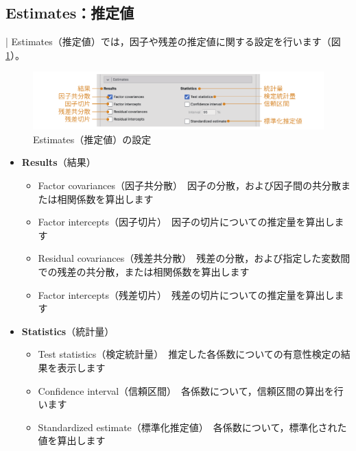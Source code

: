 \documentclass[
  12pt,
  a5jpaper,
  lualatex, ja=standard]{bxjsbook}
\providecommand{\tightlist}{%
  \setlength{\itemsep}{0pt}\setlength{\parskip}{0pt}}
\newenvironment{jmvsettings}{%
	\begin{center}%
	\begin{tcolorbox}[%
		title=設定項目,
		colframe=gmoji,
		colbacktitle=gmoji,
		colback=gmoji!2!white,
		breakable,
		width=.9\textwidth,
		]\small\addtolength{\leftmargini}{-3\labelsep}%
	}%
	{\end{tcolorbox}\end{center}}
\begin{document}
\hypertarget{sub:factor-cfa-estimates}{%
\subsection{Estimates：推定値}\label{sub:factor-cfa-estimates}}

\colorbox{bar}{\textcolor{gmoji2}{| Estimates}}（推定値）では，因子や残差の推定値に関する設定を行います（図\ref{fig:factor-cfa-estimates}）。

\begin{figure}[!ht]

{\centering \includegraphics[width=1\linewidth]{images/factor/cfa-estimates} 

}

\caption{Estimates（推定値）の設定}\label{fig:factor-cfa-estimates}
\end{figure}

\begin{jmvsettings}

\begin{itemize}
\tightlist
\item
  \textbf{Results}（結果）

  \begin{itemize}
  \tightlist
  \item
    Factor covariances（因子共分散）　因子の分散，および因子間の共分散または相関係数を算出します
  \item
    Factor intercepts（因子切片）　因子の切片についての推定量を算出します
  \item
    Residual covariances（残差共分散）　残差の分散，および指定した変数間での残差の共分散，または相関係数を算出します
  \item
    Factor intercepts（残差切片）　残差の切片についての推定量を算出します
  \end{itemize}
\item
  \textbf{Statistics}（統計量）

  \begin{itemize}
  \tightlist
  \item
    Test statistics（検定統計量）　推定した各係数についての有意性検定の結果を表示します
  \item
    Confidence interval（信頼区間）　各係数について，信頼区間の算出を行います
  \item
    Standardized estimate（標準化推定値）　各係数について，標準化された値を算出します
  \end{itemize}
\end{itemize}

\end{jmvsettings}
\end{document}
